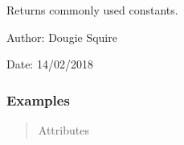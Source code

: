 \documentclass[letterpaper,10pt,english]{sphinxmanual}
\begin{document}

\begin{fulllineitems}
\label{\detokenize{utils_doc:utils.constants}}
Returns commonly used constants.

\begin{DUlineblock}{0em}
\item[] Author: Dougie Squire
\item[] Date: 14/02/2018
\end{DUlineblock}
\subsubsection*{Examples}

\begin{sphinxVerbatim}[commandchars=\\\{\}]
  
\end{sphinxVerbatim}
\begin{quote}\begin{description}
\item[{Attributes}] \leavevmode\begin{description}
\item[{}] \leavevmode
\item[{}] \leavevmode
\item[{}] \leavevmode
\item[{}] \leavevmode
\item[{}] \leavevmode
\item[{}] \leavevmode
\item[{}] \leavevmode
\item[{}] \leavevmode
\item[{}] \leavevmode
\item[{}] \leavevmode
\item[{}] \leavevmode
\item[{}] \leavevmode
\end{description}

\end{description}\end{quote}

\end{fulllineitems}
\end{document}
